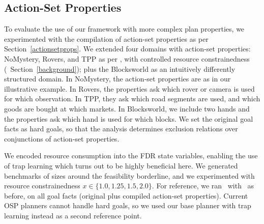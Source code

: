 \subsection{Action-Set Properties}





To evaluate the use of our framework with more complex plan
properties, we experimented with the compilation of action-set
properties as per Section~\ref{actionsetprops}.
%
We extended four domains with action-set properties: NoMystery,
Rovers, and TPP as per \cite{nakhost:etal:icaps-12}, with controlled
resource constrainedness (\cf\ Section~\ref{background}); plus the
Blocksworld as an intuitively differently structured domain.
%
In NoMystery, the action-set properties are as in our illustrative
example. In Rovers, the properties ask which rover or camera is used
for which observation. In TPP, they ask which road segments are used,
and which goods are bought at which markets. In Blocksworld, we
include two hands and the properties ask which hand is used for which
blocks.
%
We set the original goal facts as hard goals, so that the analysis
determines exclusion relations over conjunctions of action-set
properties.

We encoded resource consumption into the FDR state variables, enabling
the use of trap learning which turns out to be highly beneficial
here. We generated benchmarks of sizes around the feasibility
borderline, and we experimented with resource constrainedness
$x \in \{1.0, 1.25, 1.5, 2.0\}$. For reference, we ran \astar\
with \hlmcut\ as before, on all goal facts (original plus compiled
action-set properties). Current OSP planners cannot handle hard goals,
so we used our base planner with trap learning instead as a second
reference point.

